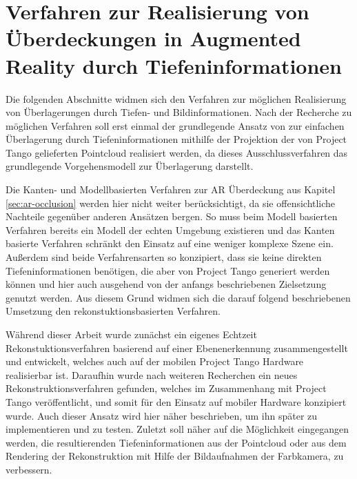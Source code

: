 \chapter{Verfahren zur Realisierung von Überdeckungen in Augmented Reality durch Tiefen\-informationen} \label{sec:optimization}


Die folgenden Abschnitte widmen sich den Verfahren zur möglichen Realisierung von Überlagerungen durch Tiefen- und Bildinformationen. Nach der Recherche zu möglichen Verfahren soll erst einmal der grundlegende Ansatz von \citet{wloka1995resolving} zur einfachen Überlagerung durch Tiefeninformationen mithilfe der Projektion der von Project Tango gelieferten Pointcloud realisiert werden, da dieses Ausschlussverfahren das grundlegende Vorgehensmodell zur Überlagerung darstellt. 

Die Kanten- und Modellbasierten Verfahren zur AR Überdeckung aus Kapitel \ref{sec:ar-occlusion} werden hier nicht weiter berücksichtigt, da sie offensichtliche Nachteile gegenüber anderen Ansätzen bergen. So muss beim Modell basierten Verfahren bereits ein Modell der echten Umgebung existieren und das Kanten basierte Verfahren schränkt den Einsatz auf eine weniger komplexe Szene ein. Außerdem sind beide Verfahrensarten so konzipiert, dass sie keine direkten Tiefeninformationen benötigen, die aber von Project Tango generiert werden können und hier auch ausgehend von der anfangs beschriebenen Zielsetzung genutzt werden. Aus diesem Grund widmen sich die darauf folgend beschriebenen Umsetzung den rekonstuktionsbasierten Verfahren.

Während dieser Arbeit wurde zunächst ein eigenes Echtzeit Rekonstuktionsverfahren basierend auf einer Ebenenerkennung zusammengestellt und entwickelt, welches auch auf der mobilen Project Tango Hardware realisierbar ist. Daraufhin wurde nach weiteren Recherchen ein neues Rekonstruktionsverfahren gefunden, welches im Zusammenhang mit Project Tango veröffentlicht, und somit für den Einsatz auf mobiler Hardware konzipiert wurde. Auch dieser Ansatz wird hier näher beschrieben, um ihn später zu implementieren und zu testen. Zuletzt soll näher auf die Möglichkeit eingegangen werden, die resultierenden Tiefeninformationen aus der Pointcloud oder aus dem Rendering der Rekonstruktion mit Hilfe der Bildaufnahmen der Farbkamera, zu verbessern. 









